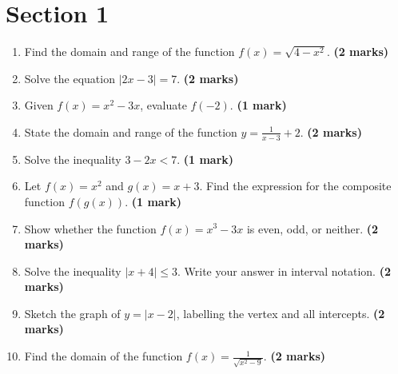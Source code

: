 \documentclass{article}
\begin{document}
\section*{Section 1}
\begin{enumerate}
    \item Find the domain and range of the function $f(x) = \sqrt{4 - x^2}$. \hfill \textbf{(2 marks)}
    \vspace{0.5cm}

    \item Solve the equation $|2x - 3| = 7$. \hfill \textbf{(2 marks)}
    \vspace{0.5cm}

    \item Given $f(x) = x^2 - 3x$, evaluate $f(-2)$. \hfill \textbf{(1 mark)}
    \vspace{0.5cm}

    \item State the domain and range of the function $y = \frac{1}{x-3} + 2$. \hfill \textbf{(2 marks)}
    \vspace{0.5cm}

    \item Solve the inequality $3 - 2x < 7$. \hfill \textbf{(1 mark)}
    \vspace{0.5cm}

    \item Let $f(x) = x^2$ and $g(x) = x + 3$. Find the expression for the composite function $f(g(x))$. \hfill \textbf{(1 mark)}
    \vspace{0.5cm}

    \item Show whether the function $f(x) = x^3 - 3x$ is even, odd, or neither. \hfill \textbf{(2 marks)}
    \vspace{0.5cm}

    \item Solve the inequality $|x + 4| \le 3$. Write your answer in interval notation. \hfill \textbf{(2 marks)}
    \vspace{0.5cm}

    \item Sketch the graph of $y = |x - 2|$, labelling the vertex and all intercepts. \hfill \textbf{(2 marks)}
    \vspace{0.5cm}

    \item Find the domain of the function $f(x) = \frac{1}{\sqrt{x^2 - 9}}$. \hfill \textbf{(2 marks)}
    \vspace{0.5cm}


\end{enumerate}
\end{document}
